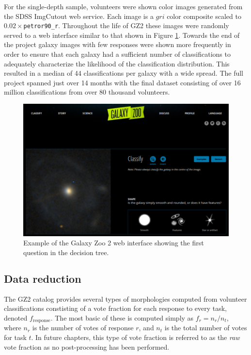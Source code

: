 For the single-depth sample, volunteers were shown color images generated from the SDSS ImgCutout web service. Each image is a $gri$ color composite scaled to $0.02\times$\texttt{petror90\_r}. Throughout the life of GZ2 these images were randomly served to a web interface similar to that shown in Figure \ref{fig: gz2 interface}. Towards the end of the project galaxy images with few responses were shown more frequently in order to ensure that each galaxy had a sufficient number of classifications to adequately characterize the likelihood of the classification distribution. This resulted in a median of 44 classifications per galaxy with a wide spread. The full project spanned just over 14 months with the final dataset consisting of over 16 million classifications from over 80 thousand volunteers. 
 
\begin{figure}[h!]
\includegraphics[width=\textwidth]{Figures/GZ2interface.pdf}
\caption[Example of the Galaxy Zoo 2 web interface]{Example of the Galaxy Zoo 2 web interface showing the first question in the decision tree.}
\label{fig: gz2 interface}
\end{figure}

\subsection{Data reduction}
The GZ2 catalog provides several types of morphologies computed from volunteer classifications constisting of a vote fraction for each response to every task, denoted $f_{\mathrm{response}}$. The most basic of these is computed simply as $f_r = n_r/n_t$, where $n_r$ is the number of votes of response $r$, and $n_t$ is the total number of votes for task $t$. In future chapters, this type of vote fraction is referred to as the \textit{raw} vote fraction as no post-processing has been performed. 

